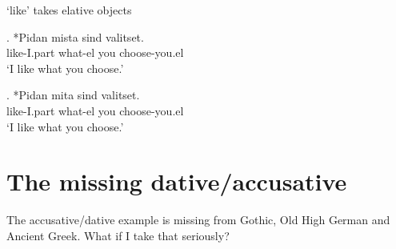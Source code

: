  `like' takes elative objects

\exg. *Pidan mista sind valitset.\\
like-I.part what-el you choose-you.el\\
`I like what you choose.'

\exg. *Pidan mita sind valitset.\\
like-I.part what-el you choose-you.el\\
`I like what you choose.'

\section{The missing dative/accusative}

The accusative/dative example is missing from Gothic, Old High German and Ancient Greek. What if I take that seriously?
